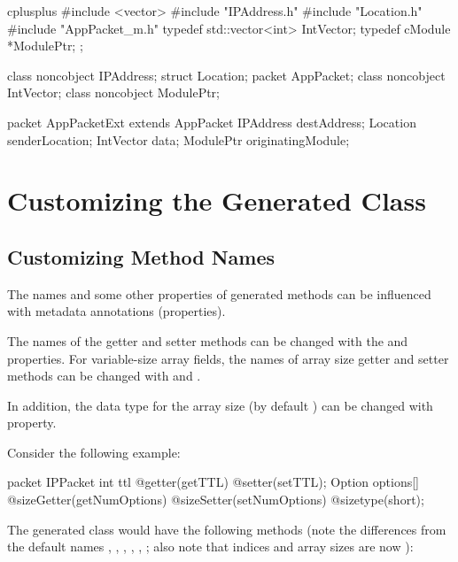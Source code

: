 \begin{msg}
cplusplus {{
#include <vector>
#include "IPAddress.h"
#include "Location.h"
#include "AppPacket_m.h"
typedef std::vector<int> IntVector;
typedef cModule *ModulePtr;
}};

class noncobject IPAddress;
struct Location;
packet AppPacket;
class noncobject IntVector;
class noncobject ModulePtr;

packet AppPacketExt extends AppPacket {
    IPAddress destAddress;
    Location senderLocation;
    IntVector data;
    ModulePtr originatingModule;
}
\end{msg}


\section{Customizing the Generated Class}
\label{sec:msg-defs:customizing-generated-class}


\subsection{Customizing Method Names}
\label{sec:msg-defs:customizing-method-names}

The names and some other properties of generated methods can be influenced
with metadata annotations (properties).

The names of the getter and setter methods can be changed with the
 and  properties. For variable-size array
fields, the names of array size getter and setter methods can be changed
with  and .

In addition, the data type for the array size (by default ) can be changed with  property.

Consider the following example:

\begin{msg}
packet IPPacket {
    int ttl @getter(getTTL) @setter(setTTL);
    Option options[] @sizeGetter(getNumOptions)
                     @sizeSetter(setNumOptions)
                     @sizetype(short);
}
\end{msg}

The generated class would have the following methods (note the differences
from the default names , , ,
, , ;
also note that indices and array sizes are now ):

